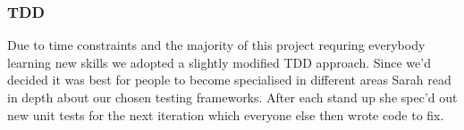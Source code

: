   \subsubsection{TDD}
    Due to time constraints and the majority of this project requring everybody learning new skills we adopted a slightly modified TDD approach. Since we'd decided it was best for people to become specialised in different areas Sarah read in depth about our chosen testing frameworks. After each stand up she spec'd out new unit tests for the next iteration which everyone else then wrote code to fix.
